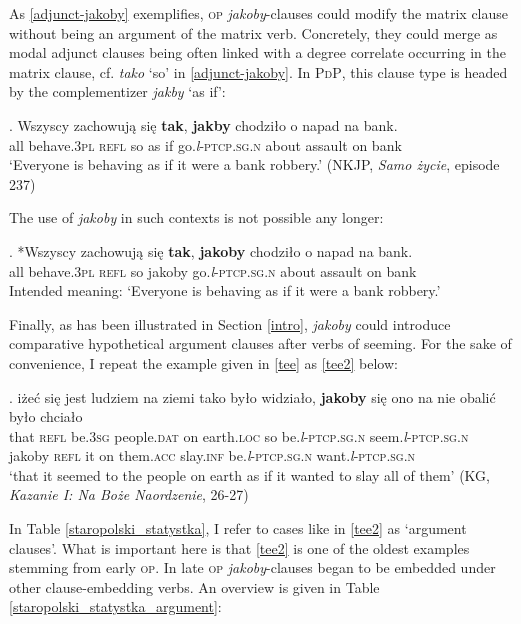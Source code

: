 \documentclass[output=paper
,modfonts
,nonflat]{langsci/langscibook}
\newcommand{\glossformat}[1]{\textsc{#1}}
\newcommand{\thirdperson}{\glossformat{3}\xspace}
\newcommand{\acc}{\glossformat{acc}\xspace}
\newcommand{\dat}{\glossformat{dat}\xspace}
\newcommand{\infv}{\glossformat{inf}\xspace}
\newcommand{\loc}{\glossformat{loc}\xspace}
\newcommand{\lptcp}{\emph{l}\glossformat{-ptcp}\xspace}
\newcommand{\n}{\glossformat{n}\xspace}
\newcommand{\pl}{\glossformat{pl}\xspace}
\newcommand{\refl}{\glossformat{refl}\xspace}
\newcommand{\sg}{\glossformat{sg}\xspace}
\newcommand{\nquelle}[1]{\newline\phantom{x}\hfill(#1)}
\begin{document}
As \ref{adjunct-jakoby} exemplifies, \textsc{op} \emph{jakoby}-clauses could modify the matrix clause without being an argument of the matrix verb. Concretely, they could merge as modal adjunct clauses being often linked with a degree correlate occurring in the matrix clause, cf. \emph{tako} `so' in \ref{adjunct-jakoby}. In \textsc{PdP}, this clause type is headed by the complementizer \emph{jakby} `as if':

\exg.		Wszyscy zachowują się \textbf{tak}, \textbf{jakby} chodziło o napad na bank. \\
		all behave.{\thirdperson}{\pl} {\refl} so {as if} go.{\lptcp}.{\sg}.{\n} about assault on bank \\
		`Everyone is behaving as if it were a bank robbery.' \nquelle{NKJP, \emph{Samo życie}, episode 237} 

The use of \emph{jakoby} in such contexts is not possible any longer: 

\exg.		*Wszyscy zachowują się \textbf{tak}, \textbf{jakoby} chodziło o napad na bank. \\
		all behave.{\thirdperson}{\pl} {\refl} so jakoby go.{\lptcp}.{\sg}.{\n} about assault on bank \\
		Intended meaning: `Everyone is behaving as if it were a bank robbery.'

Finally, as has been illustrated in Section \ref{intro}, \emph{jakoby} could introduce comparative hypothetical argument clauses after verbs of seeming. For the sake of convenience, I repeat the example given in \ref{tee} as \ref{tee2} below:  

\exg.		iżeć się jest ludziem na ziemi tako było widziało, \textbf{jakoby} się ono na nie obalić było chciało \label{tee2} \\
			that {\refl} be.{\thirdperson}{\sg} people.{\dat} on earth.{\loc} so be.{\lptcp}.{\sg}.{\n} seem.{\lptcp}.{\sg}.{\n} jakoby {\refl} it on them.{\acc} slay.{\infv} be.{\lptcp}.{\sg}.{\n} want.{\lptcp}.{\sg}.{\n} \\
		`that it seemed to the people on earth as if it wanted to slay all of them' \nquelle{KG, \emph{Kazanie I: Na Boże Naordzenie}, 26-27}	

In Table \ref{staropolski_statystka}, I refer to cases like in \ref{tee2}  as `argument clauses'. What is important here is that \ref{tee2} is one of the oldest examples stemming from early \textsc{op}. In late \textsc{op} \emph{jakoby}-clauses began to be embedded under other clause-embedding verbs. An overview is given in Table \ref{staropolski_statystka_argument}: 
\end{document}
